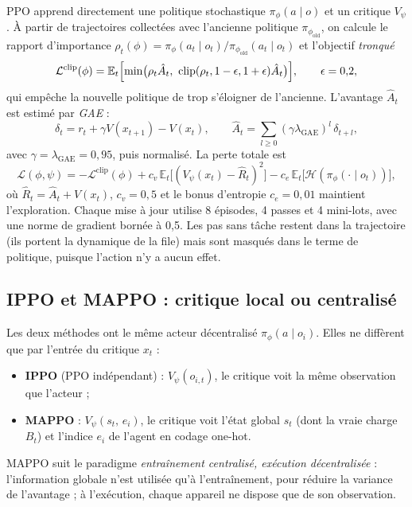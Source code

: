 \documentclass[11pt,a4paper]{article}
\newcommand{\E}{\mathbb{E}}
\begin{document}
PPO apprend directement une politique stochastique $\pi_\phi(a\mid o)$ et un critique $V_\psi$. À partir de
trajectoires collectées avec l'ancienne politique $\pi_{\phi_{\text{old}}}$, on calcule le rapport
d'importance $\rho_t(\phi)=\pi_\phi(a_t\mid o_t)/\pi_{\phi_{\text{old}}}(a_t\mid o_t)$ et l'objectif
\emph{tronqué}
\begin{equation}
  \mathcal{L}^{\text{clip}}(\phi)=\E_t\Bigl[\min\bigl(\rho_t\hat A_t,\ \mathrm{clip}(\rho_t,1-\epsilon,1+\epsilon)\hat A_t\bigr)\Bigr],
  \qquad \epsilon=0{,}2,
\end{equation}
qui empêche la nouvelle politique de trop s'éloigner de l'ancienne. L'avantage $\hat A_t$ est estimé par
\emph{GAE} :
\begin{equation}
  \delta_t = r_t+\gamma V(x_{t+1})-V(x_t),\qquad
  \hat A_t=\sum_{l\ge0}(\gamma\lambda_{\text{GAE}})^l\,\delta_{t+l},
\end{equation}
avec $\gamma=\lambda_{\text{GAE}}=0{,}95$, puis normalisé. La perte totale est
\begin{equation}
  \mathcal{L}(\phi,\psi) = -\mathcal{L}^{\text{clip}}(\phi) + c_v\,\E_t\bigl[(V_\psi(x_t)-\hat R_t)^2\bigr]
  - c_e\,\E_t\bigl[\mathcal{H}(\pi_\phi(\cdot\mid o_t))\bigr],
\end{equation}
où $\hat R_t=\hat A_t+V(x_t)$, $c_v=0{,}5$ et le bonus d'entropie $c_e=0{,}01$ maintient l'exploration. Chaque
mise à jour utilise 8 épisodes, 4 passes et 4 mini-lots, avec une norme de gradient bornée à 0{,}5. Les pas sans
tâche restent dans la trajectoire (ils portent la dynamique de la file) mais sont masqués dans le terme de
politique, puisque l'action n'y a aucun effet.

\subsection{IPPO et MAPPO : critique local ou centralisé}

Les deux méthodes ont le même acteur décentralisé $\pi_\phi(a\mid o_i)$. Elles ne diffèrent que par l'entrée du
critique $x_t$ :
\begin{itemize}
  \item \textbf{IPPO} (PPO indépendant) : $V_\psi(o_{i,t})$, le critique voit la même observation que l'acteur ;
  \item \textbf{MAPPO} : $V_\psi(s_t,\,e_i)$, le critique voit l'état global $s_t$ (dont la vraie charge $B_t$) et
        l'indice $e_i$ de l'agent en codage one-hot.
\end{itemize}
MAPPO suit le paradigme \emph{entraînement centralisé, exécution décentralisée} : l'information globale n'est
utilisée qu'à l'entraînement, pour réduire la variance de l'avantage ; à l'exécution, chaque appareil ne dispose
que de son observation.
\end{document}
